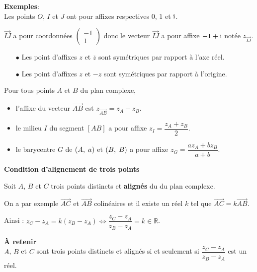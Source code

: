 \textbf{Exemples}:\\  Les points $ O$, $ I $  et $J $ ont pour affixes respectives $0 $, $  1$  et $ \text{i}$.

\medskip

$ \overrightarrow{IJ} $ a pour coordonnées $ \begin{pmatrix}
-1\\ 1
\end{pmatrix} $  donc le vecteur $ \overrightarrow{IJ} $ a pour affixe $ -1+\text{i} $ notée $ z_{\overrightarrow{IJ} } $.

\medskip

\begin{remark}
\begin{itemize}
\item[$  \bullet$] Les point d'affixes $z $ et $\overline{z} $ sont symétriques par rapport à l'axe réel.
\item[$  \bullet$] Les point d'affixes $z $ et $-z $ sont symétriques par rapport à l'origine.
\end{itemize}
\end{remark} 
\begin{property}
Pour tous points $ A$ et $ B$  du plan complexe,
\begin{itemize}
\item  l'affixe du vecteur $ \overrightarrow{AB} $ \;  est  \; $ z_{\overrightarrow{AB}}=z_A-z_B $.
\item  le milieu $ I $ du segment $ [AB] $ a pour affixe $ z_I=\dfrac{z_A+z_B }{2} $.
\item le barycentre  $ G $ de $ \left(A,\; a\right) $ et $ \left(B,\; B\right) $ a pour affixe $ z_G=\dfrac{a z_A+b z_B }{a+b} $.
\end{itemize}
\end{property}

\medskip
\textbf{Condition d'alignement de trois points}

\medskip

Soit $ A$, $ B $   et $C $  trois points distincts et \textbf{alignés} du  du plan complexe. 

On a par exemple $\overrightarrow{AC} $ et $ \overrightarrow{AB}$  colinéaires et il existe un réel $ k $ tel que $\overrightarrow{AC}=k\overrightarrow{AB}$.

\medskip

Ainsi  : $ z_C-z_A= k(z_B-z_A) \Longleftrightarrow \dfrac{ z_C-z_A}{z_B-z_A}=k\in\mathbb{R}$.

\textbf{À retenir}\\
$ A$, $ B $   et $C $  sont trois points distincts et alignés  si et seulement si  $ \dfrac{ z_C-z_A}{z_B-z_A }$ est un réel.



